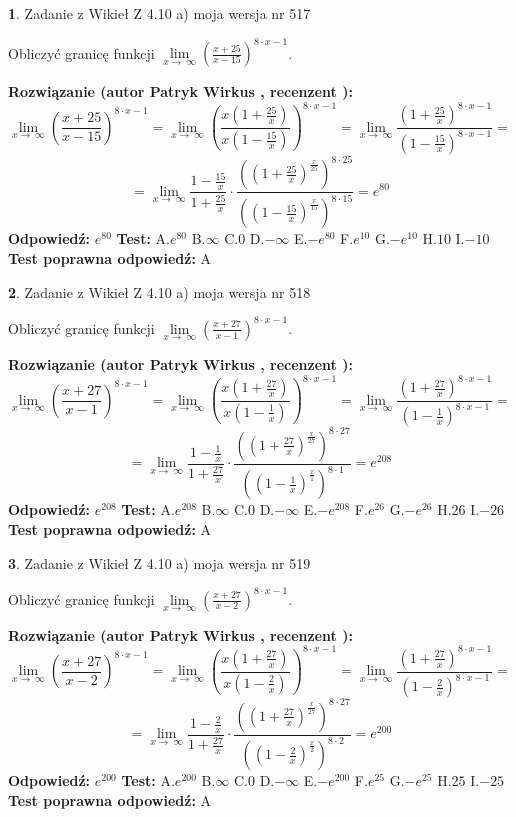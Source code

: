 \documentclass[12pt, a4paper]{article}
\theoremstyle{definition} %
\newtheorem{zad}{}
\newcommand{\zadStart}[1]{\begin{zad}#1\newline}
\newcommand{\zadStop}{\end{zad}}
\newcommand{\rozwStart}[2]{\noindent \textbf{Rozwiązanie (autor #1 , recenzent #2): }\newline}
\newcommand{\rozwStop}{\newline}
\newcommand{\odpStart}{\noindent \textbf{Odpowiedź:}\newline}
\newcommand{\odpStop}{\newline}
\newcommand{\testStart}{\noindent \textbf{Test:}\newline}
\newcommand{\testStop}{\newline}
\newcommand{\kluczStart}{\noindent \textbf{Test poprawna odpowiedź:}\newline}
\newcommand{\kluczStop}{\newline}
\begin{document}
\zadStart{Zadanie z Wikieł Z 4.10 a) moja wersja nr 517}

Obliczyć granicę funkcji  $\lim\limits_{x\to\ \infty}(\frac{x+25}{x-15})^{8\cdot x-1}$.
\zadStop
\rozwStart{Patryk Wirkus}{}
$$\lim\limits_{x\to\ \infty}(\frac{x+25}{x-15})^{8\cdot x-1} = \lim\limits_{x\to\ \infty}(\frac{x(1+\frac{25}{x})}{x(1-\frac{15}{x})})^{8\cdot x-1}=\lim\limits_{x\to\ \infty}\frac{(1+\frac{25}{x})^{8\cdot x-1}}{(1-\frac{15}{x})^{8\cdot x-1}}=$$
$$=\lim\limits_{x\to\ \infty}\frac{1-\frac{15}{x}}{1+\frac{25}{x}}\cdot\frac{((1+\frac{25}{x})^{\frac{x}{25}})^{8\cdot25}}{((1-\frac{15}{x})^{\frac{x}{15}})^{8\cdot15}}=e^{80}$$
\rozwStop
\odpStart
$e^{80}$
\odpStop
\testStart
A.$e^{80}$ B.$\infty$ C.$0$ D.$-\infty$ E.$-e^{80}$
F.$e^{10}$ G.$-e^{10}$
H.$10$
I.$-10$
\testStop
\kluczStart
A
\kluczStop



\zadStart{Zadanie z Wikieł Z 4.10 a) moja wersja nr 518}

Obliczyć granicę funkcji  $\lim\limits_{x\to\ \infty}(\frac{x+27}{x-1})^{8\cdot x-1}$.
\zadStop
\rozwStart{Patryk Wirkus}{}
$$\lim\limits_{x\to\ \infty}(\frac{x+27}{x-1})^{8\cdot x-1} = \lim\limits_{x\to\ \infty}(\frac{x(1+\frac{27}{x})}{x(1-\frac{1}{x})})^{8\cdot x-1}=\lim\limits_{x\to\ \infty}\frac{(1+\frac{27}{x})^{8\cdot x-1}}{(1-\frac{1}{x})^{8\cdot x-1}}=$$
$$=\lim\limits_{x\to\ \infty}\frac{1-\frac{1}{x}}{1+\frac{27}{x}}\cdot\frac{((1+\frac{27}{x})^{\frac{x}{27}})^{8\cdot27}}{((1-\frac{1}{x})^{\frac{x}{1}})^{8\cdot1}}=e^{208}$$
\rozwStop
\odpStart
$e^{208}$
\odpStop
\testStart
A.$e^{208}$ B.$\infty$ C.$0$ D.$-\infty$ E.$-e^{208}$
F.$e^{26}$ G.$-e^{26}$
H.$26$
I.$-26$
\testStop
\kluczStart
A
\kluczStop



\zadStart{Zadanie z Wikieł Z 4.10 a) moja wersja nr 519}

Obliczyć granicę funkcji  $\lim\limits_{x\to\ \infty}(\frac{x+27}{x-2})^{8\cdot x-1}$.
\zadStop
\rozwStart{Patryk Wirkus}{}
$$\lim\limits_{x\to\ \infty}(\frac{x+27}{x-2})^{8\cdot x-1} = \lim\limits_{x\to\ \infty}(\frac{x(1+\frac{27}{x})}{x(1-\frac{2}{x})})^{8\cdot x-1}=\lim\limits_{x\to\ \infty}\frac{(1+\frac{27}{x})^{8\cdot x-1}}{(1-\frac{2}{x})^{8\cdot x-1}}=$$
$$=\lim\limits_{x\to\ \infty}\frac{1-\frac{2}{x}}{1+\frac{27}{x}}\cdot\frac{((1+\frac{27}{x})^{\frac{x}{27}})^{8\cdot27}}{((1-\frac{2}{x})^{\frac{x}{2}})^{8\cdot2}}=e^{200}$$
\rozwStop
\odpStart
$e^{200}$
\odpStop
\testStart
A.$e^{200}$ B.$\infty$ C.$0$ D.$-\infty$ E.$-e^{200}$
F.$e^{25}$ G.$-e^{25}$
H.$25$
I.$-25$
\testStop
\kluczStart
A
\kluczStop
\end{document}
